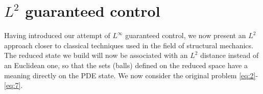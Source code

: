 % 
% 
% 
% 
% 
% 
% 
% 

\section{$L^2$ guaranteed control}

Having introduced our attempt of $L^\infty$ guaranteed control, we now present 
an $L^2$ approach closer to classical techniques used in the field of
structural mechanics. The reduced state we build will now be associated
with an $L^2$ distance instead of an Euclidean one, so that the sets (balls) 
defined on the reduced space have a meaning directly on the PDE state.
We now consider the original problem \eqref{eq:2}-\eqref{eq:7}.

